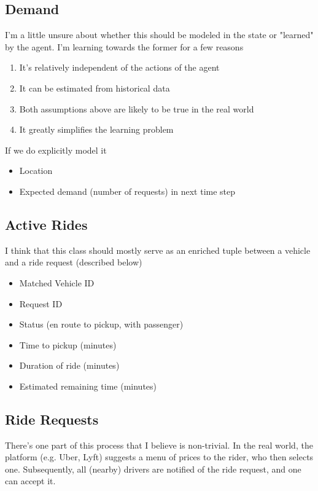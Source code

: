 \documentclass[12pt]{article}
\begin{document}
\medskip
\subsection*{Demand}
I'm a little unsure about whether this should be  modeled in the state or
"learned" by the
agent. I'm learning towards the former for a few reasons
\begin{enumerate}
		\item It's relatively independent of the actions of the agent
		\item It can be estimated from historical data
		\item Both assumptions above are likely to be true in the real world
		\item It greatly simplifies the learning problem
\end{enumerate}
If we do explicitly model it
\begin{itemize}
		\item Location
		\item Expected demand (number of requests) in next time step
\end{itemize}

\medskip
\subsection*{Active Rides}
I think that this class should mostly serve as an enriched tuple between a vehicle and a
ride request (described below)
\begin{itemize}
		\item Matched Vehicle ID
		\item Request ID
		\item Status (en route to pickup, with passenger)
		\item Time to pickup (minutes)
		\item Duration of ride (minutes)
		\item Estimated remaining time (minutes)
\end{itemize}

\medskip
\subsection*{Ride Requests}

There's one part of this process that I believe is non-trivial. In the real world, the
platform (e.g. Uber, Lyft) suggests a menu of prices to the rider, who then selects one.
Subsequently, all (nearby) drivers are notified of the ride request, and one can accept it.
\end{document}

